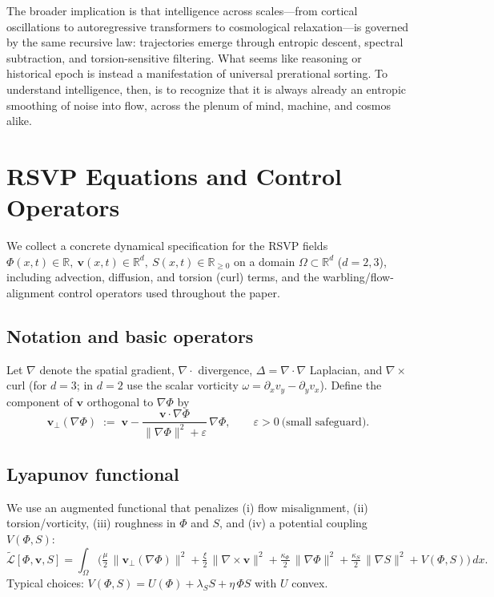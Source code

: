 \documentclass[a4paper,11pt]{article}
\begin{document}
The broader implication is that intelligence across scales---from cortical
oscillations to autoregressive transformers to cosmological relaxation---is
governed by the same recursive law: trajectories emerge through entropic
descent, spectral subtraction, and torsion-sensitive filtering. What seems
like reasoning or historical epoch is instead a manifestation of universal
prerational sorting. To understand intelligence, then, is to recognize that it
is always already an entropic smoothing of noise into flow, across the plenum
of mind, machine, and cosmos alike.


\appendix

\appendix
\section{RSVP Equations and Control Operators}
\label{app:rsvp-equations}

We collect a concrete dynamical specification for the RSVP fields
\(
\Phi(x,t)\in\mathbb{R},\ 
\mathbf{v}(x,t)\in\mathbb{R}^d,\ 
S(x,t)\in\mathbb{R}_{\ge 0}
\)
on a domain \(\Omega\subset\mathbb{R}^d\) (\(d=2,3\)), including advection,
diffusion, and torsion (curl) terms, and the warbling/flow-alignment control
operators used throughout the paper.

\subsection{Notation and basic operators}
Let \(\nabla\) denote the spatial gradient, \(\nabla\cdot\) divergence,
\(\Delta=\nabla\cdot\nabla\) Laplacian, and \(\nabla\times\) curl (for \(d=3\);
in \(d=2\) use the scalar vorticity \(\omega=\partial_x v_y-\partial_y v_x\)).
Define the component of \(\mathbf{v}\) orthogonal to \(\nabla\Phi\) by
\[
\mathbf{v}_\perp(\nabla\Phi)
\;:=\;
\mathbf{v}-\frac{\mathbf{v}\!\cdot\!\nabla\Phi}{\|\nabla\Phi\|^2+\varepsilon}\,\nabla\Phi,
\qquad \varepsilon>0\ \text{(small safeguard)}.
\]

\subsection{Lyapunov functional}
We use an augmented functional that penalizes (i) flow misalignment,
(ii) torsion/vorticity, (iii) roughness in \(\Phi\) and \(S\), and (iv) a
potential coupling \(V(\Phi,S)\):
\begin{equation}
\label{eq:aug-L}
\widetilde{\mathcal{L}}[\Phi,\mathbf{v},S]
=
\int_\Omega
\Big(
\tfrac{\mu}{2}\,\|\mathbf{v}_\perp(\nabla\Phi)\|^2
+\tfrac{\xi}{2}\,\|\nabla\times \mathbf{v}\|^2
+\tfrac{\kappa_\Phi}{2}\,\|\nabla\Phi\|^2
+\tfrac{\kappa_S}{2}\,\|\nabla S\|^2
+V(\Phi,S)
\Big)\,dx.
\end{equation}
Typical choices: \(V(\Phi,S)=U(\Phi)+\lambda_S S+\eta\,\Phi S\) with \(U\) convex.
\end{document}
